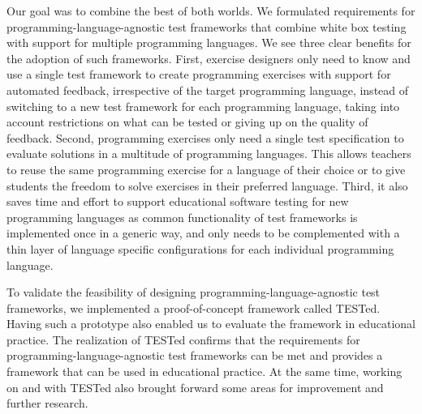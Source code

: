 \documentclass[../main]{subfiles}
\begin{document}
Our goal was to combine the best of both worlds.
We formulated requirements for programming-language-agnostic test frameworks that combine white box testing with support for multiple programming languages.
We see three clear benefits for the adoption of such frameworks.
First, exercise designers only need to know and use a single test framework to create programming exercises with support for automated feedback, irrespective of the target programming language, instead of switching to a new test framework for each programming language, taking into account restrictions on what can be tested or giving up on the quality of feedback.
Second, programming exercises only need a single test specification to evaluate solutions in a multitude of programming languages.
This allows teachers to reuse the same programming exercise for a language of their choice or to give students the freedom to solve exercises in their preferred language.
Third, it also saves time and effort to support educational software testing for new programming languages as common functionality of test frameworks is implemented once in a generic way, and only needs to be complemented with a thin layer of language specific configurations for each individual programming language.

To validate the feasibility of designing programming-language-agnostic test frameworks, we implemented a proof-of-concept framework called TESTed.
Having such a prototype also enabled us to evaluate the framework in educational practice.
The realization of TESTed confirms that the requirements for programming-language-agnostic test frameworks can be met and provides a framework that can be used in educational practice.
At the same time, working on and with TESTed also brought forward some areas for improvement and further research.
\end{document}
